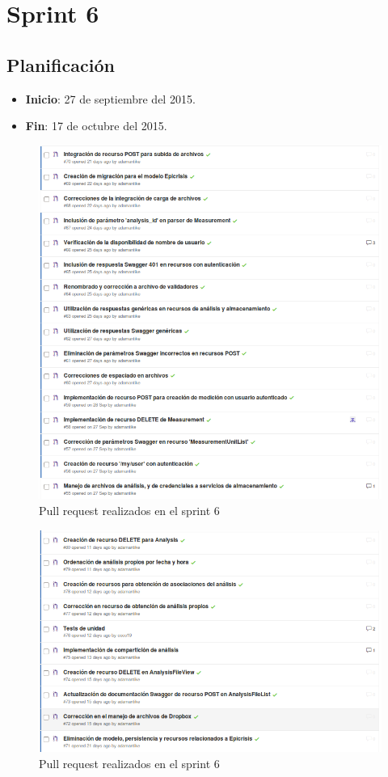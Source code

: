 \section{Sprint 6} %

\subsection{Planificación}
\begin{itemize}
    \item \textbf{Inicio}: 27 de septiembre del 2015.
    \item \textbf{Fin}: 17 de octubre del 2015.
\end{itemize}

\begin{figure}[h!]
  \centering
  \includegraphics[width=.5\textwidth]{img/6-PR_1}
  \caption{Pull request realizados en el sprint  6}
  \label{6-PR_1}
\end{figure}

\begin{figure}[h!]
	\centering
	\includegraphics[width=.8\textwidth]{img/6-PR_2}
	\caption{Pull request realizados en el sprint 6}
	\label{6-PR_1}
\end{figure}
\clearpage



